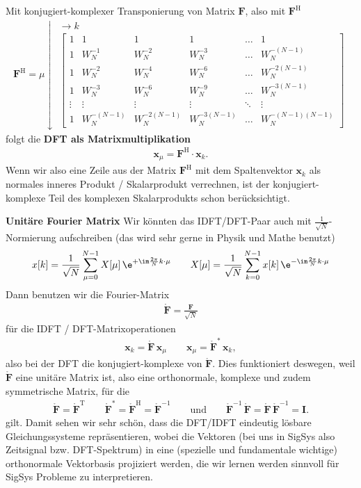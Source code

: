 Mit konjugiert-komplexer Transponierung von Matrix $\bm{F}$, also mit $\bm{F}^\mathrm{H}$
\begin{align}
\label{eq:FourierMatrixH}
\bm{F}^\mathrm{H} =
\mu \downarrow
\substack{\rightarrow k\\
\begin{bmatrix}
1 & 1 & 1 & 1 & \dots & 1\\[1em]
1 & W_N^{-1} & W_N^{-2} & W_N^{-3} & \dots & W_N^{-(N-1)}\\[1em]
1 & W_N^{-2} & W_N^{-4} & W_N^{-6} & \dots & W_N^{-2(N-1)}\\[1em]
1 & W_N^{-3} & W_N^{-6} & W_N^{-9} & \dots & W_N^{-3(N-1)}\\[1em]
\vdots & \vdots & \vdots &\vdots &\ddots & \vdots\\[1em]
1 & W_N^{-(N-1)} & W_N^{-2(N-1)} & W_N^{-3(N-1)} & \dots & W_N^{-(N-1)(N-1)}
\end{bmatrix}
}
\end{align}
folgt die \textbf{DFT als Matrixmultiplikation}
\begin{align}
\bm{x}_\mu = \bm{F}^\mathrm{H} \cdot \bm{x}_k.
\end{align}
Wenn wir also eine Zeile aus der Matrix $\bm{F}^\mathrm{H}$ mit dem Spaltenvektor $\bm{x}_k$
als normales inneres Produkt / Skalarprodukt
verrechnen, ist der konjugiert-komplexe Teil des komplexen Skalarprodukts schon
berücksichtigt.

%
\noindent\textbf{Unitäre Fourier Matrix}
Wir könnten das IDFT/DFT-Paar auch mit $\frac{1}{\sqrt{N}}$-Normierung
aufschreiben (das wird sehr gerne in Physik und Mathe benutzt)
\begin{align}
x[k] = \frac{1}{\sqrt{N}} \sum_{\mu=0}^{N-1} X[\mu] \, \e^{+\im\frac{2\pi}{N} k \cdot \mu}
\qquad
X[\mu] = \frac{1}{\sqrt{N} }\sum_{k=0}^{N-1} x[k] \, \e^{-\im\frac{2\pi}{N} k \cdot \mu}
\end{align}
Dann benutzen wir die Fourier-Matrix
\begin{align}
\mathring{\mathbf{F}} = \frac{\mathbf{F}}{\sqrt{N}}
\end{align}
für die IDFT / DFT-Matrixoperationen
\begin{align}
\bm{x}_k = \mathring{\mathbf{F}} \, \bm{x}_\mu
\qquad
\bm{x}_\mu = \mathring{\mathbf{F}}^* \, \bm{x}_k,
\end{align}
also bei der DFT die konjugiert-komplexe von $\mathring{\mathbf{F}}$.
%
Dies funktioniert deswegen, weil $\mathring{\mathbf{F}}$ eine unitäre Matrix ist,
also eine orthonormale, komplexe und zudem symmetrische Matrix, für die
\begin{align}
\mathring{\bm{F}} = \mathring{\bm{F}}^\mathrm{T}
\qquad
\mathring{\bm{F}}^* =
\mathring{\bm{F}}^\mathrm{H} =
\mathring{\bm{F}}^{-1}
\qquad\text{und}\qquad
\mathring{\bm{F}}^{-1} \, \mathring{\bm{F}} =
\mathring{\bm{F}} \, \mathring{\bm{F}}^{-1} =
\mathbf{I}.
\end{align}
gilt.
%
Damit sehen wir sehr schön, dass die DFT/IDFT eindeutig lösbare
Gleichungssysteme repräsentieren, wobei die Vektoren (bei uns in SigSys also Zeitsignal bzw.
DFT-Spektrum) in eine (spezielle und fundamentale wichtige)
orthonormale Vektorbasis projiziert werden, die wir lernen werden sinnvoll
für SigSys Probleme zu interpretieren.


